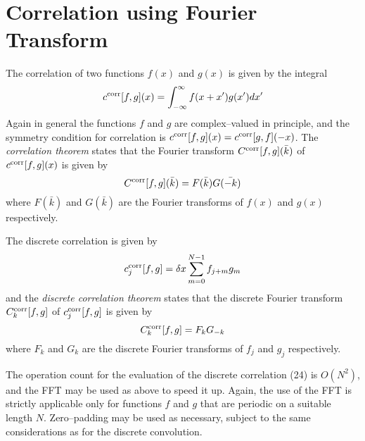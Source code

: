 \documentclass[dvips]{article}
\begin{document}
\section*{Correlation using Fourier Transform}
The correlation of two functions $f(x)$ and $g(x)$ is given by the integral 
\begin{equation}
c^{\rm corr}[f,g](x) = \int_{-\infty}^{\infty} f(x+x')g(x')dx'
\end{equation}
Again in general the functions $f$ and $g$ are complex--valued in
principle, and the symmetry condition for correlation is
$c^{\rm corr}[f,g](x) = c^{\rm corr}[g,f](-x)$.
The {\it correlation theorem} states that the Fourier transform
$C^{\rm corr}[f,g](\bar{k})$ of $c^{\rm corr}[f,g](x)$ is given by
\begin{equation}
C^{\rm corr}[f,g](\bar{k}) = F(\bar{k})G(\bar{-k})
\end{equation}
where $F(\bar{k})$ and $G(\bar{k})$ are the Fourier transforms of $f(x)$
and $g(x)$ respectively.

The discrete correlation is given by
\begin{equation}
c^{\rm corr}_{j}[f,g] = \delta x \sum_{m=0}^{N-1} f_{j+m}g_{m}
\end{equation}
and the {\it discrete correlation
theorem} states that the discrete Fourier transform
$C^{\rm corr}_{k}[f,g]$ of $c^{\rm corr}_{j}[f,g]$ is given by
\begin{equation}
C^{\rm corr}_{k}[f,g] = F_{k}G_{-k}
\end{equation}
where $F_{k}$ and $G_{k}$ are the discrete Fourier transforms of $f_{j}$
and $g_{j}$ respectively.

The operation count for the evaluation of the discrete correlation (24)
is $O(N^{2})$, and the FFT may be used as above to speed it up.  Again,
the use of the FFT is strictly applicable only for functions $f$ and $g$
that are periodic on a suitable length $N$.  Zero--padding may be used as
necessary, subject to the same considerations as for the discrete convolution.
\end{document}
